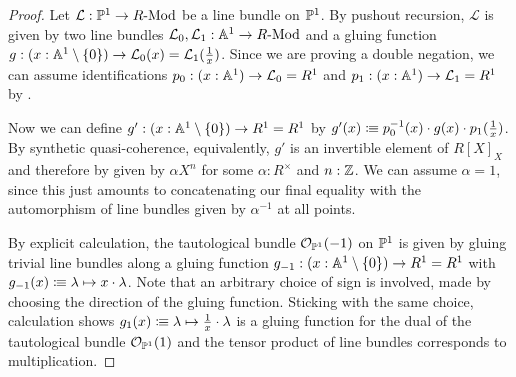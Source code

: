 \begin{proof}
  Let $\mathcal{L}:\mathbb{P}^1\to R\text{-}\mathrm{Mod}$ be a line bundle on $\mathbb{P}^1$.
  By pushout recursion, $\mathcal{L}$ is given by two line bundles $\mathcal L_0,\mathcal L_1:\mathbb{A}^1\to R\text{-}\mathrm{Mod}$
  and a gluing function $g:(x:\mathbb{A}^1\setminus\{0\})\to \mathcal L_0(x)=\mathcal L_1(\frac{1}{x})$.
  Since we are proving a double negation, we can assume identifications $p_0:(x:\mathbb{A}^1)\to \mathcal L_0=R^1$
  and $p_1:(x:\mathbb{A}^1)\to \mathcal L_1=R^1$ by .

  Now we can define $g':(x:\mathbb{A}^1\setminus\{0\})\to R^1=R^1$ by $g'(x)\vcentcolon\mspace{-1.2mu}\equiv p_0^{-1}(x)\cdot g(x)\cdot p_1(\frac{1}{x})$.
  By synthetic quasi-coherence, equivalently, $g'$ is an invertible element of $R[X]_X$
  and therefore by  given by $\alpha X^n$ for some $\alpha:R^\times$ and $n:\mathbb{Z}$.
  We can assume $\alpha=1$, since this just amounts to concatenating
  our final equality with the automorphism of line bundles given by $\alpha^{-1}$ at all points.

  By explicit calculation, the tautological bundle $\mathcal O_{\mathbb{P}^1}(-1)$ on $\mathbb{P}^1$ is given by gluing trivial line bundles along
  a gluing function $g_{-1}:(x:\mathbb{A}^1\setminus\{0\})\to R^1=R^1$ with $g_{-1}(x)\vcentcolon\mspace{-1.2mu}\equiv \lambda\mapsto x\cdot \lambda$.
  Note that an arbitrary choice of sign is involved, made by choosing the direction of the gluing function.
  Sticking with the same choice, calculation shows $g_1(x)\vcentcolon\mspace{-1.2mu}\equiv \lambda\mapsto \frac{1}{x}\cdot \lambda$
  is a gluing function for the dual of the tautological bundle $\mathcal O_{\mathbb{P}^1}(1)$
  and the tensor product of line bundles corresponds to multiplication.
\end{proof}
